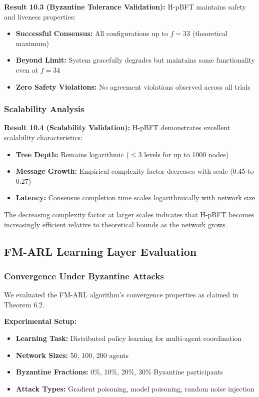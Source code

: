 \documentclass[conference]{IEEEtran}
\begin{document}
\textbf{Result 10.3 (Byzantine Tolerance Validation):} H-pBFT maintains safety and liveness properties:
\begin{itemize}
    \item \textbf{Successful Consensus:} All configurations up to $f = 33$ (theoretical maximum)
    \item \textbf{Beyond Limit:} System gracefully degrades but maintains some functionality even at $f = 34$
    \item \textbf{Zero Safety Violations:} No agreement violations observed across all trials
\end{itemize}

\subsubsection{Scalability Analysis}

\textbf{Result 10.4 (Scalability Validation):} H-pBFT demonstrates excellent scalability characteristics:

\begin{itemize}
    \item \textbf{Tree Depth:} Remains logarithmic ($\leq 3$ levels for up to 1000 nodes)
    \item \textbf{Message Growth:} Empirical complexity factor decreases with scale (0.45 to 0.27)
    \item \textbf{Latency:} Consensus completion time scales logarithmically with network size
\end{itemize}

The decreasing complexity factor at larger scales indicates that H-pBFT becomes increasingly efficient relative to theoretical bounds as the network grows.

\subsection{FM-ARL Learning Layer Evaluation}

\subsubsection{Convergence Under Byzantine Attacks}

We evaluated the FM-ARL algorithm's convergence properties as claimed in Theorem 6.2.

\textbf{Experimental Setup:}
\begin{itemize}
    \item \textbf{Learning Task:} Distributed policy learning for multi-agent coordination
    \item \textbf{Network Sizes:} 50, 100, 200 agents
    \item \textbf{Byzantine Fractions:} 0\%, 10\%, 20\%, 30\% Byzantine participants
    \item \textbf{Attack Types:} Gradient poisoning, model poisoning, random noise injection
\end{itemize}
\end{document}
